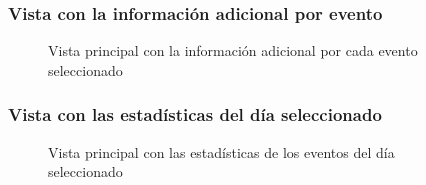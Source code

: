 \subsubsection{Vista con la información adicional por evento}

\begin{figure}[H]
\caption{Vista principal con la información adicional por cada evento seleccionado}
\end{figure}

\subsubsection{Vista con las estadísticas del día seleccionado}

\begin{figure}[H]
\caption{Vista principal con las estadísticas de los eventos del día seleccionado}
\end{figure}
